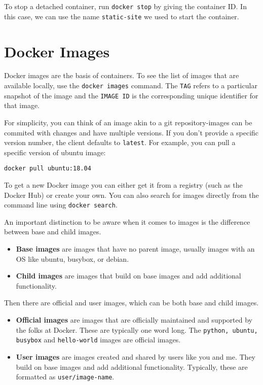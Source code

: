 \documentclass[twoside,twocolumn]{article}
\begin{document}
To stop a detached container, run \texttt{docker stop} by giving the container ID.
In this case, we can use the name \texttt{static-site} we used to start the container.

\section{Docker Images}
Docker images are the basis of containers.
To see the list of images that are available locally, use the \texttt{docker images} command.
The \texttt{TAG} refers to a particular snapshot of the image and the \texttt{IMAGE ID} is the corresponding unique identifier for that image.

For simplicity, you can think of an image akin to a git repository-images can be commited with changes and have multiple versions.
If you don't provide a specific version number, the client defaults to \texttt{latest}. For example, you can pull a specific version of ubuntu image:
\begin{verbatim}
docker pull ubuntu:18.04
\end{verbatim}
To get a new Docker image you can either get it from a registry (such as the Docker Hub) or create your own.
You can also search for images directly from the command line using \texttt{docker search}.

An important distinction to be aware when it comes to images is the difference between base and child images.
\begin{itemize}
    \item \textbf{Base images} are images that have no parent image, usually images with an OS like ubuntu, busybox, or debian.
    \item \textbf{Child images} are images that build on base images and add additional functionality.
\end{itemize}

Then there are official and user images, which can be both base and child images.
\begin{itemize}
    \item \textbf{Official images} are images that are officially maintained and supported by the folks at Docker. These are typically one word long. The \texttt{python, ubuntu, busybox} and \texttt{hello-world} images are official images.
    \item \textbf{User images} are images created and shared by users like you and me. They build on base images and add additional functionality. Typically, these are formatted as \texttt{user/image-name}.
\end{itemize}
\end{document}
